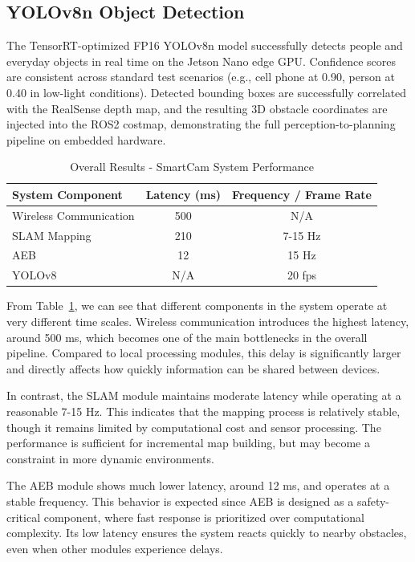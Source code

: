 \documentclass[journal,transmag]{IEEEtran}
\begin{document}
\subsection{YOLOv8n Object Detection} The TensorRT-optimized FP16 YOLOv8n model successfully detects people and everyday objects in real time on the Jetson Nano edge GPU. Confidence scores are consistent across standard test scenarios (e.g., cell phone at 0.90, person at 0.40 in low-light conditions). Detected bounding boxes are successfully correlated with the RealSense depth map, and the resulting 3D obstacle coordinates are injected into the ROS2 costmap, demonstrating the full perception-to-planning pipeline on embedded hardware.

\begin{table}[H]
\centering
\caption{Overall Results - SmartCam System Performance}
\label{tab:overall}
\begin{tabular}{lcc}
\toprule
\textbf{System Component} & \textbf{Latency (ms)} & \textbf{Frequency / Frame Rate} \\
\midrule
Wireless Communication & 500 & N/A \\
SLAM Mapping           & 210 & 7-15 Hz \\
AEB                    & 12  & 15 Hz \\
YOLOv8                 & N/A & 20 fps \\
\bottomrule
\end{tabular}
\end{table}

From Table~\ref{tab:overall}, we can see that different components in the system operate at very different time scales. Wireless communication introduces the highest latency, around 500 ms, which becomes one of the main bottlenecks in the overall pipeline. Compared to local processing modules, this delay is significantly larger and directly affects how quickly information can be shared between devices.

In contrast, the SLAM module maintains moderate latency while operating at a reasonable 7-15 Hz. This indicates that the mapping process is relatively stable, though it remains limited by computational cost and sensor processing. The performance is sufficient for incremental map building, but may become a constraint in more dynamic environments.

The AEB module shows much lower latency, around 12 ms, and operates at a stable frequency. This behavior is expected since AEB is designed as a safety-critical component, where fast response is prioritized over computational complexity. Its low latency ensures the system reacts quickly to nearby obstacles, even when other modules experience delays.
\end{document}
